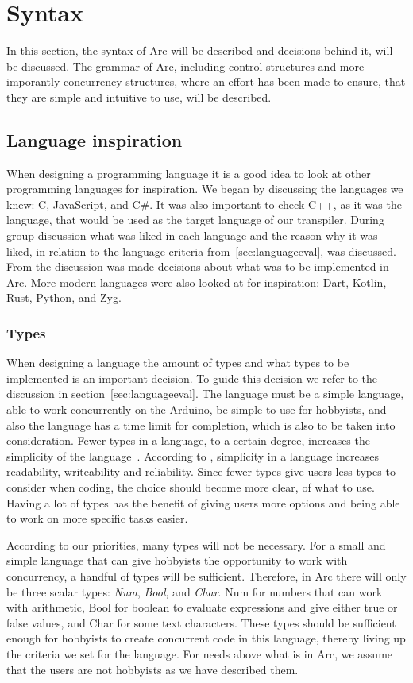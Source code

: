 \section{Syntax}\label{sec:syntax}
In this section, the syntax of Arc will be described and decisions behind it, will be discussed. The grammar of Arc, including control structures and more imporantly concurrency structures, where an effort has been made to ensure, that they are simple and intuitive to use, will be described. 

\subsection{Language inspiration}\label{sec:inspiration}
When designing a programming language it is a good idea to look at other programming languages for inspiration. We began by discussing the languages we knew: C, JavaScript, and C\#. It was also important to check C++, as it was the language, that would be used as the target language of our transpiler. During group discussion what was liked in each language and the reason why it was liked, in relation to the language criteria from~\ref{sec:languageeval}, was discussed. From the discussion was made decisions about what was to be implemented in Arc. More modern languages were also looked at for inspiration: Dart, Kotlin, Rust, Python, and Zyg. 

\subsubsection{Types}

When designing a language the amount of types and what types to be implemented is an important decision. To guide this decision we refer to the discussion in section~\ref{sec:languageeval}. The language must be a simple language, able to work concurrently on the Arduino, be simple to use for hobbyists, and also the language has a time limit for completion, which is also to be taken into consideration. Fewer types in a language, to a certain degree, increases the simplicity of the language~\cite{Sebesta2016}. According to , simplicity in a language increases readability, writeability and reliability. Since fewer types give users less types to consider when coding, the choice should become more clear, of what to use. Having a lot of types has the benefit of giving users more options and being able to work on more specific tasks easier.

According to our priorities, many types will not be necessary. For a small and simple language that can give hobbyists the opportunity to work with concurrency, a handful of types will be sufficient. Therefore, in Arc there will only be three scalar types: \textit{Num}, \textit{Bool}, and \textit{Char}. Num for numbers that can work with arithmetic, Bool for boolean to evaluate expressions and give either true or false values, and Char for some text characters. These types should be sufficient enough for hobbyists to create concurrent code in this language, thereby living up the criteria we set for the language. For needs above what is in Arc, we assume that the users are not hobbyists as we have described them. 

